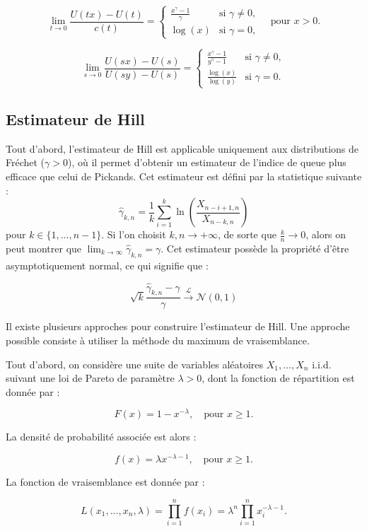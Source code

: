 \documentclass{article}
\begin{document}
\[
\lim_{t \to 0} \frac{U(tx) - U(t)}{c(t)} = 
\begin{cases} 
\frac{x^\gamma - 1}{\gamma} & \text{si } \gamma \neq 0, \\
\log(x) & \text{si } \gamma = 0, 
\end{cases}
\quad \text{pour } x > 0.
\]

\[
\lim_{s \to 0} \frac{U(sx) - U(s)}{U(sy) - U(s)} = 
\begin{cases} 
\frac{x^\gamma - 1}{y^\gamma - 1} & \text{si } \gamma \neq 0, \\
\frac{\log(x)}{\log(y)} & \text{si } \gamma = 0.
\end{cases}
\]

\subsection{Estimateur de Hill}

Tout d'abord, l'estimateur de Hill est applicable uniquement aux distributions de Fréchet (\(\gamma > 0\)), où il permet d'obtenir un estimateur de l'indice de queue plus efficace que celui de Pickands. Cet estimateur est défini par la statistique suivante :
\[
\hat{\gamma}_{k,n} = \frac{1}{k} \sum_{i=1}^{k} \ln(\frac{X_{n-i+1,n}}{X_{n-k,n}})
\]
pour \( k \in \{1, \dots, n-1\} \).
Si l'on choisit \( k, n \to +\infty \), de sorte que \(\frac{k}{n} \to 0\), alors on peut montrer que \(\lim_{k \to \infty} \hat{\gamma}_{k,n} = \gamma\). Cet estimateur possède la propriété d'être asymptotiquement normal, ce qui signifie que :

\[
\sqrt{k} \frac{\hat{\gamma}_{k,n} - \gamma}{\gamma} \xrightarrow{\mathcal{L}} \mathcal{N}(0,1)
\]

Il existe plusieurs approches pour construire l'estimateur de Hill. Une approche possible consiste à utiliser la méthode du maximum de vraisemblance. 

Tout d'abord, on considère une suite de variables aléatoires \( X_1, \dots, X_n \) i.i.d. suivant une loi de Pareto de paramètre \( \lambda > 0 \), dont la fonction de répartition est donnée par :  

\[
F(x) = 1 - x^{-\lambda}, \quad \text{pour } x \geq 1.
\]

La densité de probabilité associée est alors :

\[
f(x) = \lambda x^{-\lambda - 1}, \quad \text{pour } x \geq 1.
\]

La fonction de vraisemblance est donnée par :

\[
L(x_1, \dots, x_n, \lambda) = \prod_{i=1}^{n} f(x_i) = \lambda^{n} \prod_{i=1}^{n} x_i^{-\lambda - 1}.
\]
\end{document}
